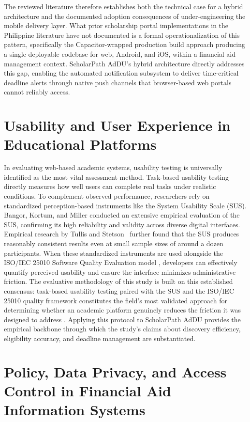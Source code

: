 The reviewed literature therefore establishes both the technical case for a hybrid architecture and the documented adoption consequences of under-engineering the mobile delivery layer. What prior scholarship portal implementations in the Philippine literature have not documented is a formal operationalization of this pattern, specifically the Capacitor-wrapped production build approach producing a single deployable codebase for web, Android, and iOS, within a financial aid management context. ScholarPath AdDU's hybrid architecture directly addresses this gap, enabling the automated notification subsystem to deliver time-critical deadline alerts through native push channels that browser-based web portals cannot reliably access.

\section{Usability and User Experience in Educational Platforms}

In evaluating web-based academic systems, usability testing is universally identified as the most vital assessment method. Task-based usability testing directly measures how well users can complete real tasks under realistic conditions. To complement observed performance, researchers rely on standardized perception-based instruments like the System Usability Scale (SUS). Bangor, Kortum, and Miller \cite{ref13} conducted an extensive empirical evaluation of the SUS, confirming its high reliability and validity across diverse digital interfaces. Empirical research by Tullis and Stetson~\cite{ref42} further found that
the SUS produces reasonably consistent results even at small sample
sizes of around a dozen participants. When these standardized instruments are used alongside the ISO/IEC 25010 Software Quality Evaluation model \cite{ref31}, developers can effectively quantify perceived usability and ensure the interface minimizes administrative friction. The evaluative methodology of this study is built on this established consensus: task-based usability testing paired with the SUS and the ISO/IEC 25010 quality framework constitutes the field's most validated approach for determining whether an academic platform genuinely reduces the friction it was designed to address \cite{ref13,ref31,ref42}. Applying this protocol to ScholarPath AdDU provides the empirical backbone through which the study's claims about discovery efficiency, eligibility accuracy, and deadline management are substantiated.

\section{Policy, Data Privacy, and Access Control in Financial Aid Information Systems}

